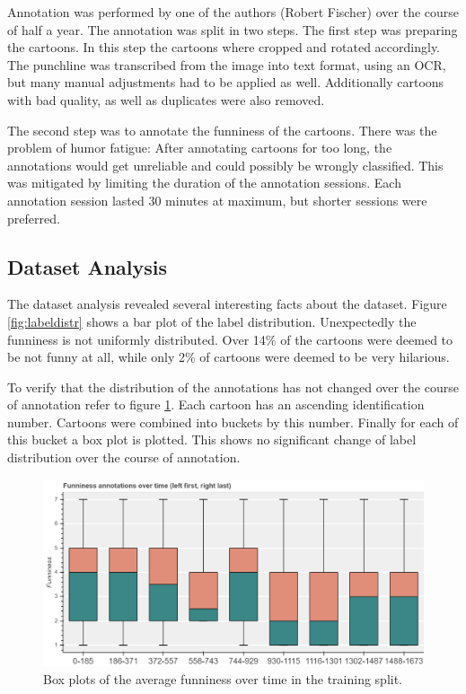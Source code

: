 \documentclass[draft,final,oneside]{vutinfth} %
\begin{document}
Annotation was performed by one of the authors (Robert Fischer) over the course of half a year. The annotation was split in two steps. The first step was preparing the cartoons. In this step the cartoons where cropped and rotated accordingly. The punchline was transcribed from the image into text format, using an OCR, but many manual adjustments had to be applied as well. Additionally cartoons with bad quality, as well as duplicates were also removed.

The second step was to annotate the funniness of the cartoons. There was the problem of humor fatigue: After annotating cartoons for too long, the annotations would get unreliable and could possibly be wrongly classified. This was mitigated by limiting the duration of the annotation sessions. Each annotation session lasted 30 minutes at maximum, but shorter sessions were preferred. 

\subsection{Dataset Analysis}

The dataset analysis revealed several interesting facts about the dataset. Figure \ref{fig:labeldistr} shows a bar plot of the label distribution. Unexpectedly the funniness is not uniformly distributed. Over 14\% of the cartoons were deemed to be not funny at all, while only 2\% of cartoons were deemed to be very hilarious.

To verify that the distribution of the annotations has not changed over the course of annotation refer to figure \ref{fig:boxplottime}. Each cartoon has an ascending identification number. Cartoons were  combined into buckets by this number. Finally for each of this bucket a box plot is plotted. This shows no significant change of label distribution over the course of annotation.

\begin{figure}
	\centering
  	\includegraphics[width=1.0\textwidth]{graphics/average_funniness_over_time}
	\caption{Box plots of the average funniness over time in the training split.}
	\label{fig:boxplottime}
\end{figure}
\end{document}
